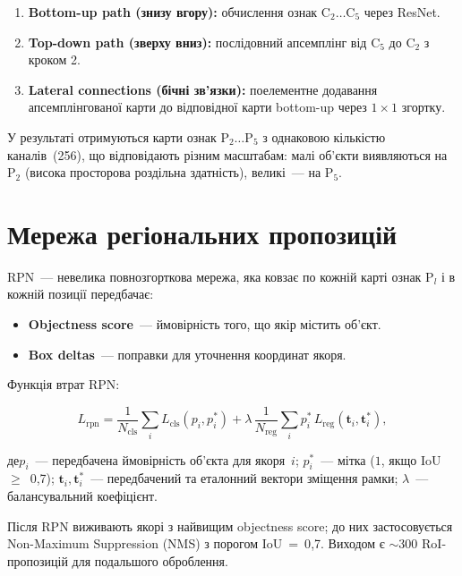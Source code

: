 \documentclass[14pt,a4paper]{extreport}
\newcommand{\where}{\par\noindent де\quad}
\begin{document}
\begin{enumerate}
  \item \textbf{Bottom-up path (знизу вгору):} обчислення ознак
        $\mathrm{C}_2\ldots\mathrm{C}_5$ через ResNet.
  \item \textbf{Top-down path (зверху вниз):} послідовний апсемплінг від
        $\mathrm{C}_5$ до $\mathrm{C}_2$ з кроком 2.
  \item \textbf{Lateral connections (бічні зв'язки):}
        поелементне додавання апсемплінгованої карти до відповідної
        карти bottom-up через $1\!\times\!1$ згортку.
\end{enumerate}

У результаті отримуються карти ознак $\mathrm{P}_2\ldots\mathrm{P}_5$ з
однаковою кількістю каналів~(256), що відповідають різним масштабам:
малі об'єкти виявляються на $\mathrm{P}_2$ (висока просторова роздільна
здатність), великі~--- на $\mathrm{P}_5$.

\section{Мережа регіональних пропозицій}

RPN~--- невелика повнозгорткова мережа, яка ковзає по кожній карті
ознак $\mathrm{P}_l$ і в кожній позиції передбачає:

\begin{itemize}
  \item \textbf{Objectness score}~--- ймовірність того, що якір містить
        об'єкт.
  \item \textbf{Box deltas}~--- поправки для уточнення координат якоря.
\end{itemize}

Функція втрат RPN:

\begin{equation}
  L_{\mathrm{rpn}} = \frac{1}{N_{\mathrm{cls}}}
    \sum_{i} L_{\mathrm{cls}}\!\left(p_i, p^*_i\right)
    + \lambda\,\frac{1}{N_{\mathrm{reg}}}
    \sum_{i} p^*_i\,L_{\mathrm{reg}}\!\left(\mathbf{t}_i,
    \mathbf{t}^*_i\right),
  \label{eq:rpn}
\end{equation}

\where $p_i$~--- передбачена ймовірність об'єкта для якоря~$i$;
$p^*_i$~--- мітка ($1$, якщо IoU~$\geq$~0{,}7);
$\mathbf{t}_i,\mathbf{t}^*_i$~--- передбачений та еталонний вектори
зміщення рамки; $\lambda$~--- балансувальний коефіцієнт.

Після RPN виживають якорі з найвищим objectness score; до них
застосовується Non-Maximum Suppression (NMS) з порогом IoU~=~0{,}7.
Виходом є $\sim$300 RoI-пропозицій для подальшого оброблення.
\end{document}
